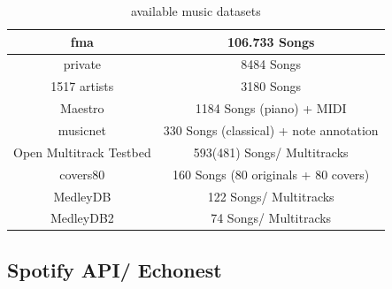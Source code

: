 \begin{table}[h]
	\caption{available music datasets}
	\label{table_dsets}
	\begin{center}
		\begin{tabular}{|c||c|}
			\hline
			fma & 106.733 Songs\\
			\hline
			private & 8484 Songs\\
			\hline
			1517 artists & 3180 Songs\\
			\hline
			Maestro & 1184 Songs (piano) + MIDI\\
			\hline
			musicnet & 330 Songs (classical) + note annotation\\
			\hline
			Open Multitrack Testbed & 593(481) Songs/ Multitracks\\
			\hline
			covers80 & 160 Songs (80 originals + 80 covers)\\
			\hline
			MedleyDB &  122 Songs/ Multitracks\\
			\hline
			MedleyDB2 &  74 Songs/ Multitracks\\
			\hline
		\end{tabular}
	\end{center}
\end{table}

\subsection{Spotify API/ Echonest}\label{spotipy}

